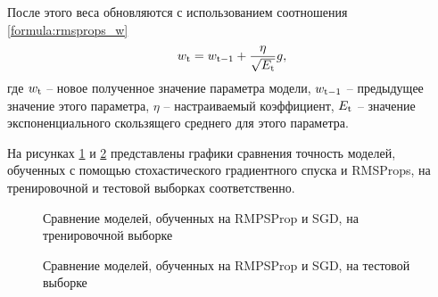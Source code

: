 После этого веса обновляются с использованием соотношения \ref{formula:rmsprops_w}
\begin{equation}\label{formula:rmsprops_w}
w_{\rm{t}} = w_{\rm{t-1}} + \frac{\eta}{\sqrt{E_{\rm{t}}}}g,
\end{equation}
где $w_{\rm{t}}$ -- новое полученное значение параметра модели, $w_{\rm{t-1}}$ -- предыдущее значение этого параметра, $\eta$ -- настраиваемый коэффициент, $E_{\rm{t}}$ -- значение экспоненциального скользящего среднего для этого параметра.

На рисунках \ref{img:sgd_rmsprops_training} и \ref{img:sgd_rmsprops_test} представлены графики сравнения точность моделей, обученных с помощью стохастического градиентного спуска и RMSProps, на тренировочной и тестовой выборках соответственно.

\begin{figure}[H]
	\begin{center}
		\caption{Сравнение моделей, обученных на RMPSProp и SGD, на тренировочной выборке}
		\label{img:sgd_rmsprops_training}
	\end{center}
\end{figure}
\begin{figure}[H]
	\begin{center}
		\caption{Сравнение моделей, обученных на RMPSProp и SGD, на тестовой выборке}
		\label{img:sgd_rmsprops_test}
	\end{center}
\end{figure}

